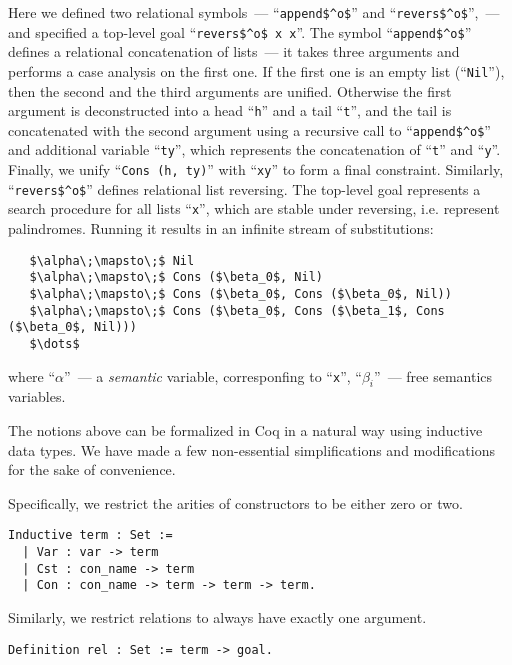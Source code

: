 Here we defined two relational symbols~--- ``\lstinline|append$^o$|'' and ``\lstinline|revers$^o$|'',~--- and specified a top-level goal ``\lstinline|revers$^o$ x x|''.
The symbol ``\lstinline|append$^o$|'' defines a relational concatenation of lists~--- it takes three arguments and performs a case analysis on the first one. If the
first one is an empty list (``\lstinline|Nil|''), then the second and the third arguments are unified. Otherwise the first argument is deconstructed into a head ``\lstinline|h|''
and a tail ``\lstinline|t|'', and the tail is concatenated with the second argument using a recursive call to ``\lstinline|append$^o$|'' and additional variable ``\lstinline|ty|'', which
represents the concatenation of ``\lstinline|t|'' and ``\lstinline|y|''. Finally, we unify ``\lstinline|Cons (h, ty)|'' with ``\lstinline|xy|'' to form a final constraint. Similarly,
``\lstinline|revers$^o$|'' defines relational list reversing. The top-level goal represents a search procedure for all lists ``\lstinline|x|'', which are stable under reversing, i.e.
represent palindromes. Running it results in an infinite stream of substitutions:

\begin{lstlisting}
   $\alpha\;\mapsto\;$ Nil
   $\alpha\;\mapsto\;$ Cons ($\beta_0$, Nil)
   $\alpha\;\mapsto\;$ Cons ($\beta_0$, Cons ($\beta_0$, Nil))
   $\alpha\;\mapsto\;$ Cons ($\beta_0$, Cons ($\beta_1$, Cons ($\beta_0$, Nil)))
   $\dots$
\end{lstlisting}

where ``$\alpha$''~--- a \emph{semantic} variable, corresponfing to ``\lstinline|x|'', ``$\beta_i$''~--- free semantics variables.

The notions above can be formalized in Coq in a natural way using inductive data types. We have made a few non-essential simplifications and modifications for the sake of convenience.

Specifically, we restrict the arities of constructors to be either zero or two.

\begin{lstlisting}[language=Coq]
  Inductive term : Set :=
  | Var : var -> term
  | Cst : con_name -> term
  | Con : con_name -> term -> term -> term.
\end{lstlisting}

Similarly, we restrict relations to always have exactly one argument.

\begin{lstlisting}[language=Coq]
  Definition rel : Set := term -> goal.
\end{lstlisting}

